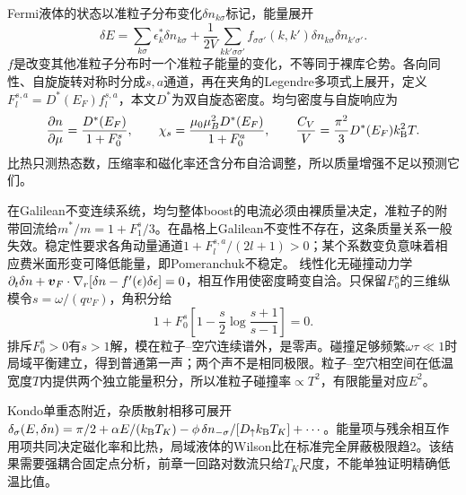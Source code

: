 Fermi液体的状态以准粒子分布变化$\delta n_{k\sigma}$标记，能量展开
\begin{equation}
\delta E=\sum_{k\sigma}\epsilon^*_{k}\delta n_{k\sigma}+\frac1{2V}\sum_{kk'\sigma\sigma'}f_{\sigma\sigma'}(k,k')\delta n_{k\sigma}\delta n_{k'\sigma'}.
\end{equation}
$f$是改变其他准粒子分布时一个准粒子能量的变化，不等同于裸库仑势。各向同性、自旋旋转对称时分成$s,a$通道，再在夹角的Legendre多项式上展开，定义$F_l^{s,a}=D^*(E_F)f_l^{s,a}$，本文$D^*$为双自旋态密度。均匀密度与自旋响应为
\begin{equation}
\frac{\partial n}{\partial\mu}=\frac{D^*(E_F)}{1+F_0^s},\qquad \chi_s=\frac{\mu_0\mu_B^2D^*(E_F)}{1+F_0^a},\qquad\frac{C_V}{V}=\frac{\pi^2}3D^*(E_F)k_{\mathrm B}^2T.
\end{equation}
比热只测热态数，压缩率和磁化率还含分布自洽调整，所以质量增强不足以预测它们。

在Galilean不变连续系统，均匀整体boost的电流必须由裸质量决定，准粒子的附带回流给$m^*/m=1+F_1^s/3$。在晶格上Galilean不变性不存在，这条质量关系一般失效。稳定性要求各角动量通道$1+F_l^{s,a}/(2l+1)>0$；某个系数变负意味着相应费米面形变可降低能量，即Pomeranchuk不稳定。
线性化无碰撞动力学$\partial_t\delta n+\boldsymbol{v}_F\cdot\nabla_r[\delta n-f'(\epsilon)\delta\epsilon]=0$，相互作用使密度畸变自洽。只保留$F_0^s$的三维纵模令$s=\omega/(qv_F)$，角积分给
\begin{equation}
1+F_0^s\left[1-\frac s2\log\frac{s+1}{s-1}\right]=0.
\end{equation}
排斥$F_0^s>0$有$s>1$解，模在粒子--空穴连续谱外，是零声。碰撞足够频繁$\omega\tau\ll1$时局域平衡建立，得到普通第一声；两个声不是相同极限。粒子--空穴相空间在低温宽度$T$内提供两个独立能量积分，所以准粒子碰撞率$\propto T^2$，有限能量对应$E^2$。

Kondo单重态附近，杂质散射相移可展开$\delta_\sigma(E,\delta n)=\pi/2+\alpha E/(k_{\mathrm B} T_K)-\phi\,\delta n_{-\sigma}/[D_\uparrow k_{\mathrm B} T_K]+\cdots$。能量项与残余相互作用项共同决定磁化率和比热，局域液体的Wilson比在标准完全屏蔽极限趋2。该结果需要强耦合固定点分析，前章一回路对数流只给$T_K$尺度，不能单独证明精确低温比值。
